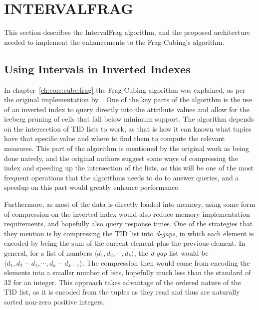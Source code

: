 
\chapter{INTERVALFRAG}\label{ch:interval}

This section describes the IntervalFrag algorithm, and the proposed architecture needed to implement the enhancements to the Frag-Cubing's algorithm.

\section{Using Intervals in Inverted Indexes}\label{ch:interval:problem}

In chapter~\ref{ch:corr:cube:frag} the Frag-Cubing algorithm was explained, as per the original implementation by~\cite{liHighdimensionalOLAPMinimal2004}.
One of the key parts of the algorithm is the use of an inverted index to query directly into the attribute values and allow for the iceberg pruning of cells that fall below minimum support.
The algorithm depends on the intersection of TID lists to work, as that is how it can known what tuples have that specific value and where to find them to compute the relevant measures.
This part of the algorithm is mentioned by the original work as being done naively, and the original authors suggest some ways of compressing the index and speeding up the intersection of the lists, as this will be one of the most frequent operations that the algorithms needs to do to answer queries, and a speedup on this part would greatly enhance performance.

Furthermore, as most of the data is directly loaded into memory, using some form of compression on the inverted index would also reduce memory implementation requirements, and hopefully also query response times.
One of the strategies that they mention is by compressing the TID list into \textit{d-gaps}, in which each element is encoded by being the sum of the current element plus the previous element.
In general, for a list of numbers $\langle d_1, d_2 , \cdots, d_k \rangle$, the \textit{d-gap} list would be $\langle d_1 , d_2 - d_1 , \cdots, d_k - d_{k - 1} \rangle$.
The compression then would come from encoding the elements into a smaller number of bits, hopefully much less than the standard of 32 for an integer.
This approach takes advantage of the ordered nature of the TID list, as it is encoded from the tuples as they read and thus are naturally sorted non-zero positive integers.

